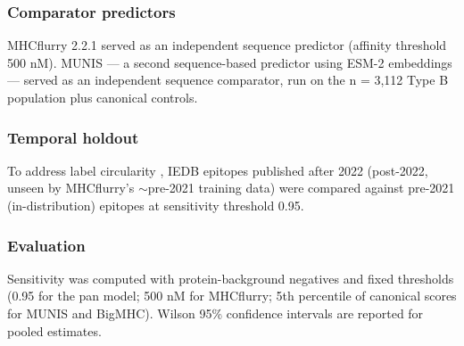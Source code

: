 \begin{methods}
\subsubsection{Comparator predictors}
MHCflurry 2.2.1 \citep{ODonnell20} served as an independent sequence predictor (affinity threshold 500 nM). MUNIS \citep{Wohlwend25} --- a second sequence-based predictor using ESM-2 embeddings \citep{Rives21} --- served as an independent sequence comparator, run on the n = 3,112 Type B population plus canonical controls.

\subsubsection{Temporal holdout}
To address label circularity \citep{Preibisch26}, IEDB epitopes published after 2022 (post-2022, unseen by MHCflurry's $\sim$pre-2021 training data) were compared against pre-2021 (in-distribution) epitopes at sensitivity threshold 0.95.

\subsubsection{Evaluation}
Sensitivity was computed with protein-background negatives and fixed thresholds (0.95 for the pan model; 500 nM for MHCflurry; 5th percentile of canonical scores for MUNIS and BigMHC). Wilson 95\% confidence intervals are reported for pooled estimates.

\end{methods}
